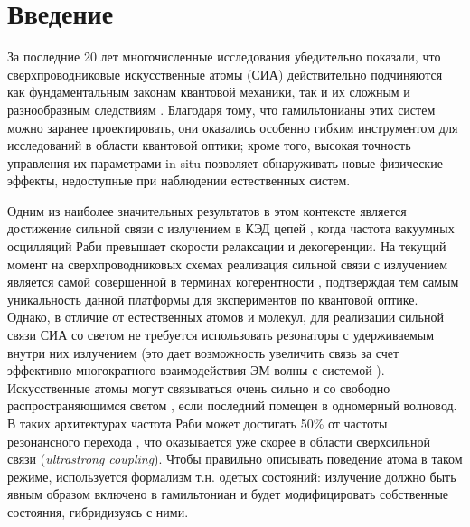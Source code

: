 \documentclass[14pt, a4paper]{extreport}
\numberwithin{equation}{section}
\begin{document}
\section{Введение}

За последние 20 лет многочисленные исследования убедительно показали, что сверхпроводниковые искусственные атомы (СИА) действительно подчиняются как фундаментальным законам квантовой механики, так и их сложным и разнообразным следствиям \cite{you2011atomic, gu2017microwave}. Благодаря тому, что гамильтонианы этих систем можно заранее проектировать, они оказались особенно гибким инструментом для исследований в области квантовой оптики; кроме того, высокая точность управления их параметрами in situ позволяет обнаруживать новые физические эффекты, недоступные при наблюдении естественных систем.

Одним из наиболее значительных результатов в этом контексте является достижение сильной связи с излучением в КЭД цепей \cite{wallraff2004strong, chiorescu2004coherent}, когда частота вакуумных осцилляций Раби превышает скорости релаксации и декогеренции.  На текущий момент на сверхпроводниковых схемах реализация сильной связи с излучением является самой совершенной в терминах когерентности \cite{forn2019ultrastrong}, подтверждая тем самым уникальность данной платформы для экспериментов по квантовой оптике. Однако, в отличие от естественных атомов и молекул, для реализации сильной связи СИА со светом не требуется использовать резонаторы с удерживаемым внутри них излучением (это дает возможность увеличить связь за счет эффективно многократного взаимодействия ЭМ волны с системой \cite{blais2004cavity}). Искусственные атомы могут связываться очень сильно и со свободно распространяющимся светом \cite{astafiev2010resonance}, если последний помещен в одномерный волновод. В таких архитектурах частота Раби может достигать 50\% от частоты резонансного перехода \cite{deng2015observation}, что оказывается уже скорее в области сверхсильной связи (\foreignlanguage{english}{\textit{ultrastrong coupling}}). Чтобы правильно описывать поведение атома в таком режиме, используется формализм т.н. одетых состояний: излучение должно быть явным образом включено в гамильтониан и будет модифицировать собственные состояния, гибридизуясь с ними. 
\end{document}
